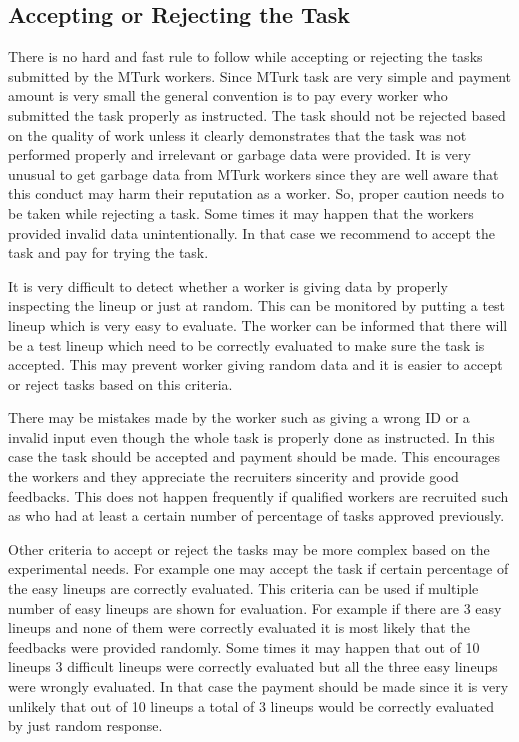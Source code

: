 \documentclass[11pt]{article}
\begin{document}
\subsection{Accepting or Rejecting the Task} There is no hard and fast rule to follow while accepting or rejecting the tasks submitted by the MTurk workers. Since MTurk task are very simple and payment amount is very small the general convention is to pay every worker who submitted the task properly as instructed. The task should not be rejected based on the quality of work unless it clearly demonstrates that the task was not performed properly and irrelevant or garbage data were provided. It is very unusual to get garbage data from MTurk workers since they are well aware that this conduct may harm their reputation as a worker. So, proper caution needs to be taken while rejecting a task. Some times it may happen that the workers provided invalid data unintentionally. In that case we recommend to accept the task and pay for trying the task.

It is very difficult to detect whether a worker is giving data by properly inspecting the lineup or just at random. This can be monitored by putting a test lineup which is very easy to evaluate. The worker can be informed that there will be a test lineup which need to be correctly evaluated to make sure the task is accepted. This may prevent worker giving random data and it is easier to accept or reject tasks based on this criteria.  

There may be mistakes made by the worker such as giving a wrong ID or a invalid input even though the whole task is properly done as instructed. In this case the task should be accepted and payment should be made. This encourages the workers and they appreciate the recruiters sincerity and provide good feedbacks. This does not happen frequently if qualified workers are recruited such as who had at least a certain number of percentage of tasks approved previously. 

Other criteria to accept or reject the tasks may be more complex based on the experimental needs. For example one may accept the task if certain percentage of the easy lineups are correctly evaluated. This criteria can be used if multiple number of easy lineups are shown for evaluation. For example if there are 3 easy lineups and none of them were correctly evaluated it is most likely that the feedbacks were provided randomly. Some times it may happen that out of 10 lineups 3 difficult lineups were correctly evaluated but all the three easy lineups were wrongly evaluated. In that case the payment should be made since it is very unlikely that out of 10 lineups a total of 3 lineups would be correctly evaluated by just random response.
\end{document}
